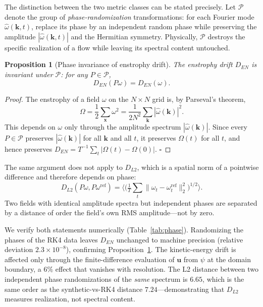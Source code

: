 \documentclass[reprint,aps,pre]{revtex4-2}
\newtheorem{proposition}{Proposition}
\begin{document}
The distinction between the two metric classes can be stated precisely. Let $\mathcal{P}$ denote the group of \textit{phase-randomization} transformations: for each Fourier mode $\hat\omega(\mathbf{k},t)$, replace its phase by an independent random phase while preserving the amplitude $|\hat\omega(\mathbf{k},t)|$ and the Hermitian symmetry. Physically, $\mathcal{P}$ destroys the specific realization of a flow while leaving its spectral content untouched.

\begin{proposition}[Phase invariance of enstrophy drift]
\label{prop:en}
The enstrophy drift $D_{EN}$ is invariant under $\mathcal{P}$: for any $P \in \mathcal{P}$,
\begin{equation}
D_{EN}(P\omega) = D_{EN}(\omega).
\end{equation}
\end{proposition}

\begin{proof}
The enstrophy of a field $\omega$ on the $N\times N$ grid is, by Parseval's theorem,
\begin{equation}
\Omega = \frac{1}{2}\sum_{\mathbf{x}}\omega^2 = \frac{1}{2N^2}\sum_{\mathbf{k}}|\hat\omega(\mathbf{k})|^2 .
\end{equation}
This depends on $\omega$ only through the amplitude spectrum $|\hat\omega(\mathbf{k})|$. Since every $P\in\mathcal{P}$ preserves $|\hat\omega(\mathbf{k})|$ for all $\mathbf{k}$ and all $t$, it preserves $\Omega(t)$ for all $t$, and hence preserves $D_{EN} = T^{-1}\sum_t|\Omega(t)-\Omega(0)|$. $\square$
\end{proof}

The same argument does not apply to $D_{L2}$, which is a spatial norm of a pointwise difference and therefore depends on phase:
\begin{equation}
D_{L2}(P\omega, P\omega^{\text{ref}}) = \Big\langle \Big(\tfrac{1}{T}\sum_t\|\omega_t-\omega_t^{\text{ref}}\|_2^2\Big)^{1/2}\Big\rangle .
\end{equation}
Two fields with identical amplitude spectra but independent phases are separated by a distance of order the field's own RMS amplitude---not by zero.

We verify both statements numerically (Table~\ref{tab:phase}). Randomizing the phases of the RK4 data leaves $D_{EN}$ unchanged to machine precision (relative deviation $2.3\times10^{-8}$), confirming Proposition~\ref{prop:en}. The kinetic-energy drift is affected only through the finite-difference evaluation of $\mathbf{u}$ from $\psi$ at the domain boundary, a $6\%$ effect that vanishes with resolution. The L2 distance between two independent phase randomizations of the \textit{same} spectrum is $6.65$, which is the same order as the synthetic-vs-RK4 distance $7.24$---demonstrating that $D_{L2}$ measures realization, not spectral content.
\end{document}
